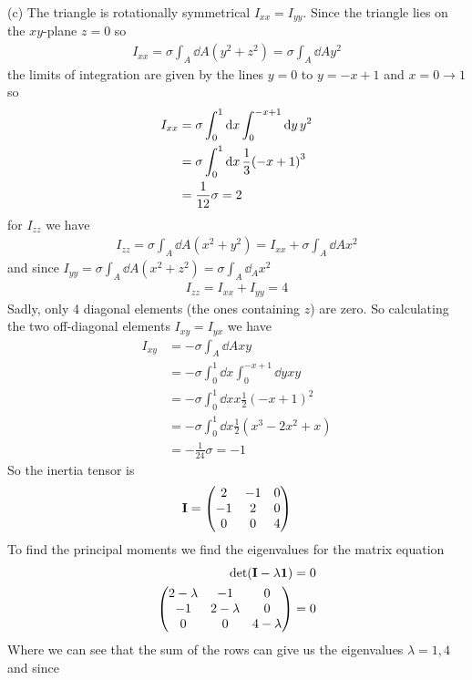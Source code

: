 \documentclass[../hw.tex]{subfiles}
\begin{document}
(c) The triangle is rotationally symmetrical $I_{xx} = I_{yy}$. Since the triangle lies on the 
$xy$-plane $z = 0$ so
\begin{align*}
    I_{xx} = \sigma \int_A \dd{A} (y^2 + z^2) = \sigma \int_A \dd{A} y^2
\end{align*}
the limits of integration are given by the lines $y = 0$ to $y = -x + 1$ and $x = 0 \to 1$ so 
\begin{align*}
    I_{xx} &= \sigma \int_0^1 \dd{x} \int_0^{-x + 1} \dd{y} y^2 \\
    &= \sigma \int_0^1 \dd{x} \frac{1}{3} \qt(-x + 1)^3 \\
    &= \frac{1}{12} \sigma = 2
\end{align*}
for $I_{zz}$ we have
\begin{align*}
    I_{zz} = \sigma \int_A \dd{A} (x^2 + y^2) = I_{xx} + \sigma \int_A \dd{A} x^2 
\end{align*}
and since $I_{yy} = \sigma \int_A \dd{A} (x^2 + z^2) = \sigma \int_A \dd_A x^2$
\begin{align*}
    I_{zz} = I_{xx} + I_{yy} = 4
\end{align*}
Sadly, only 4 diagonal elements (the ones containing $z$) are zero. So calculating the two off-diagonal
elements $I_{xy} = I_{yx}$ we have
\begin{align*}
    I_{xy} &= -\sigma \int_A \dd{A} x y \\
    &= -\sigma \int_0^1 \dd{x} \int_0^{-x + 1} \dd{y} xy \\
    &= -\sigma \int_0^1 \dd{x} x\frac{1}{2}(-x + 1)^2 \\
    &= -\sigma \int_0^1 \dd{x} \frac{1}{2} (x^3 - 2x^2 + x) \\
    &= -\frac{1}{24} \sigma = -1
\end{align*}
So the inertia tensor is
\begin{align*}
    \vb I = \mqty(2 & -1 & 0 \\
        -1 & 2 & 0 \\
        0 & 0 & 4)
\end{align*}
To find the principal moments we find the eigenvalues for the matrix equation
\begin{align*}
    \det(\vb I - \lambda \vb 1) = 0 \\
    \mqty(2 - \lambda & -1 & 0 \\
        -1 & 2 - \lambda & 0 \\
        0 & 0 & 4 - \lambda) = 0
\end{align*}
Where we can see that the sum of the rows can give us the eigenvalues $\lambda = 1, 4$ and since 
\end{document}
